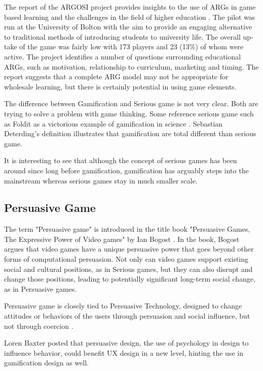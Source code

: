 The report of the ARGOSI project provides insights to the use of ARGs in game
based learning and the challenges in the field of higher education
\cite{whitton2009alternate}. The pilot was run at the University of Bolton with
the aim to provide an engaging alternative to traditional methods of
introducing students to university life. The overall up-take of the game was
fairly low with 173 players and 23 (13\%) of whom were active. The project
identifies a number of questions surrounding educational ARGs, such as
motivation, relationship to curriculum, marketing and timing. The report
suggests that a complete ARG model may not be appropriate for wholesale
learning, but there is certainly potential in using game elements.

The difference between Gamification and Serious game is not very clear. Both are trying to solve a problem with game thinking. Some reference serious game such as Foldit as a victorious example of gamification in science \cite{bosch2011}. Sebastian Deterding's definition \cite {Deterding2011mt} illustrates that gamification are total different than serious game.

It is interesting to see that although the concept of serious games has been around since long before gamification, gamification has arguably steps into the mainstream whereas serious games stay in much smaller scale.  

\subsection{Persuasive Game}
The term "Persuasive game" is introduced in the title book "Persuasive Games, The Expressive Power of Video games" by Ian Bogost \cite {bogost2007persuasive}. In the book, Bogost argues that video games have a unique persuasive power that goes beyond other forms of computational persuasion. Not only can video games support existing social and cultural positions, as in Serious games, but they can also disrupt and change those positions, leading to potentially significant long-term social change, as in Persuasive games.

Persuasive game is closely tied to Persuasive Technology, designed to change attitudes or behaviors of the users through persuasion and social influence, but not through coercion \cite {fogg_2003}.

Loren Baxter \cite {baxter_2011} posted that persuasive design, the use of psychology in design to influence behavior, could benefit UX design in a new level, hinting the use in gamification design as well.

